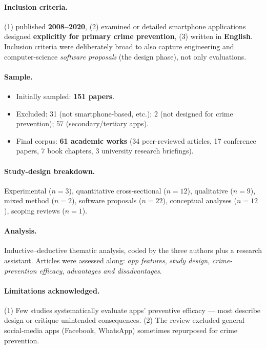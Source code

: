 \documentclass[11pt,a4paper,openany]{report}
\theoremstyle{definition}
\theoremstyle{plain}
\theoremstyle{remark}
\begin{document}
\paragraph{Inclusion criteria.} (1) published \textbf{2008--2020}, (2) examined or detailed smartphone applications designed \textbf{explicitly for primary crime prevention}, (3) written in \textbf{English}. Inclusion criteria were deliberately broad to also capture engineering and computer-science \textit{software proposals} (the design phase), not only evaluations.

\paragraph{Sample.}
\begin{itemize}
    \item Initially sampled: \textbf{151 papers}.
    \item Excluded: 31 (not smartphone-based, etc.); 2 (not designed for crime prevention); 57 (secondary/tertiary apps).
    \item Final corpus: \textbf{61 academic works} (34 peer-reviewed articles, 17 conference papers, 7 book chapters, 3 university research briefings).
\end{itemize}

\paragraph{Study-design breakdown.} Experimental ($n=3$), quantitative cross-sectional ($n=12$), qualitative ($n=9$), mixed method ($n=2$), software proposals ($n=22$), conceptual analyses ($n=12$), scoping reviews ($n=1$).

\paragraph{Analysis.} Inductive--deductive thematic analysis, coded by the three authors plus a research assistant. Articles were assessed along: \textit{app features}, \textit{study design}, \textit{crime-prevention efficacy}, \textit{advantages and disadvantages}.

\paragraph{Limitations acknowledged.} (1) Few studies systematically evaluate apps' preventive efficacy --- most describe design or critique unintended consequences. (2) The review excluded general social-media apps (Facebook, WhatsApp) sometimes repurposed for crime prevention.
\end{document}
